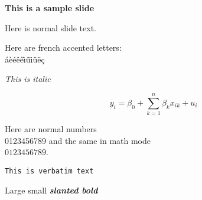 \documentclass{slides}
\begin{document}
\begin{slide}
\textbf{This is a sample slide}

Here is normal slide text.

Here are french accented letters:\\
\'a\`e\'e\^e\^e\^\i\^u\"\i\"u\"e\c c

\textit{This is italic}

\[
  y_i = \beta_0 + \sum_{k=1}^n \beta_k x_{ik} + u_i
\]

Here are normal numbers \\
0123456789 and the same in math mode \\
$0123456789$.

\begin{verbatim}
This is verbatim text \end{verbatim}

{\Large Large} {\small small}
{\slshape\bfseries slanted bold}

\end{slide}
\end{document}
